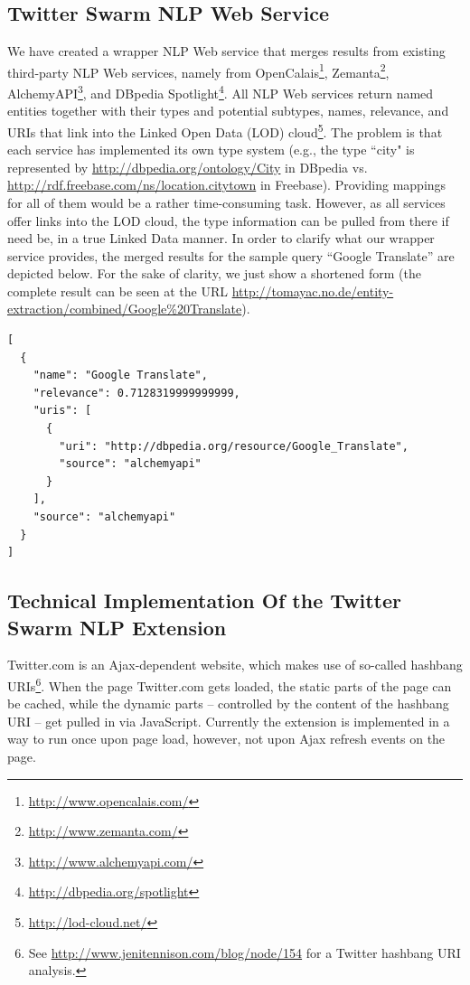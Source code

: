 \documentclass[runningheads,a4paper]{llncs}
\begin{document}

\subsection{Twitter Swarm NLP Web Service}\label{sec:webservice}
We have created a wrapper NLP Web service that merges results from existing third-party NLP Web services, namely from OpenCalais\footnote{\url{http://www.opencalais.com/}}, Zemanta\footnote{\url{http://www.zemanta.com/}}, AlchemyAPI\footnote{\url{http://www.alchemyapi.com/}}, and DBpedia\cite{Bizer:DBpedia} Spotlight\footnote{\url{http://dbpedia.org/spotlight}}. All NLP Web services return named entities together with their types and potential subtypes, names, relevance, and URIs that link into the Linked Open Data (LOD) cloud\footnote{\url{http://lod-cloud.net/}}. The problem is that each service has implemented its own type system (e.g., the type ``city" is represented by \url{http://dbpedia.org/ontology/City} in DBpedia vs. \url{http://rdf.freebase.com/ns/location.citytown} in Freebase). Providing mappings for all of them would be a rather time-consuming task. However, as all services offer links into the LOD cloud, the type information can be pulled from there if need be, in a true Linked Data manner. In order to clarify what our wrapper service provides, the merged results for the sample query ``Google Translate'' are depicted below. For the sake of clarity, we just show a shortened form (the complete result can be seen at the URL \url{http://tomayac.no.de/entity-extraction/combined/Google%20Translate}).

\begin{lstlisting}
[
  {
    "name": "Google Translate",
    "relevance": 0.7128319999999999,
    "uris": [
      {
        "uri": "http://dbpedia.org/resource/Google_Translate",
        "source": "alchemyapi"
      }
    ],
    "source": "alchemyapi"
  }
]
\end{lstlisting}

\subsection{Technical Implementation Of the Twitter Swarm NLP Extension}\label{sec:techimp}
Twitter.com is an Ajax-dependent website, which makes use of so-called hashbang URIs\footnote{See \url{http://www.jenitennison.com/blog/node/154} for a Twitter hashbang URI analysis.}. When the page Twitter.com gets loaded, the static parts of the page can be cached, while the dynamic parts -- controlled by the content of the hashbang URI -- get pulled in via JavaScript. Currently the extension is implemented in a way to run once upon page load, however, not upon Ajax refresh events on the page.
\end{document}
